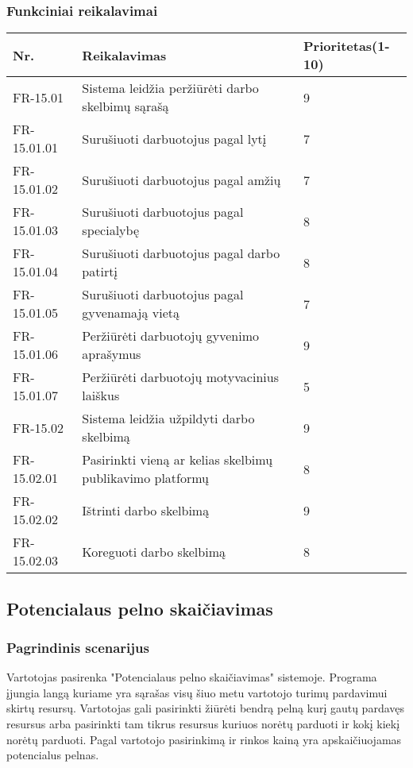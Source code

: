 \documentclass[oneside]{VUMIFPSkursinis}
\begin{document}
	\subsubsection{Funkciniai reikalavimai}
\begin{table}[htbp]
	\begin{tabularx}{1\textwidth}{ |P{2.5cm}|X|P{3cm }| }  \hline
		Nr. & Reikalavimas & Prioritetas(1-10) \\ \hline
		FR-15.01 & Sistema leidžia peržiūrėti darbo skelbimų sąrašą & 9 \\ \hline
		FR-15.01.01 & Surušiuoti darbuotojus pagal lytį & 7 \\ \hline
		FR-15.01.02 & Surušiuoti darbuotojus pagal amžių & 7 \\ \hline
		FR-15.01.03 & Surušiuoti darbuotojus pagal specialybę & 8  \\ \hline
		FR-15.01.04 & Surušiuoti darbuotojus pagal darbo patirtį & 8 \\ \hline
		FR-15.01.05 & Surušiuoti darbuotojus pagal gyvenamają vietą & 7 \\ \hline
		FR-15.01.06 & Peržiūrėti darbuotojų gyvenimo aprašymus & 9 \\ \hline
		FR-15.01.07 & Peržiūrėti darbuotojų motyvacinius laiškus & 5 \\ \hline
		FR-15.02 & Sistema leidžia užpildyti darbo skelbimą & 9 \\ \hline
		FR-15.02.01 & Pasirinkti vieną ar kelias skelbimų publikavimo platformų & 8 \\ \hline
		FR-15.02.02 & Ištrinti darbo skelbimą & 9 \\ \hline
		FR-15.02.03 & Koreguoti darbo skelbimą & 8 \\ \hline
	\end{tabularx}
\end{table}	
	
	
\subsection{Potencialaus pelno skaičiavimas}
	\subsubsection{Pagrindinis scenarijus}
	Vartotojas pasirenka "Potencialaus pelno skaičiavimas" sistemoje. Programa įjungia langą kuriame yra sąrašas visų šiuo metu vartotojo turimų pardavimui skirtų resursų. Vartotojas gali pasirinkti žiūrėti bendrą pelną kurį gautų pardavęs resursus arba pasirinkti tam tikrus resursus kuriuos norėtų parduoti ir kokį kiekį norėtų parduoti. Pagal vartotojo pasirinkimą ir rinkos kainą yra apskaičiuojamas potencialus pelnas.
\end{document}
